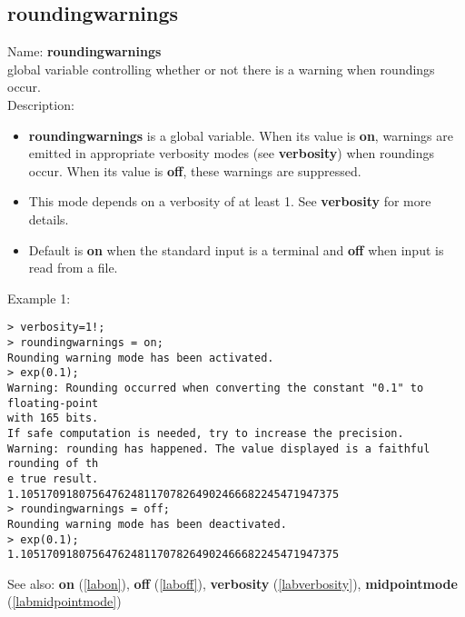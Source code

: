 \subsection{roundingwarnings}
\label{labroundingwarnings}
\noindent Name: \textbf{roundingwarnings}\\
global variable controlling whether or not there is a warning when roundings occur.\\
\noindent Description: \begin{itemize}

\item \textbf{roundingwarnings} is a global variable. When its value is \textbf{on}, warnings are
   emitted in appropriate verbosity modes (see \textbf{verbosity}) when roundings
   occur.  When its value is \textbf{off}, these warnings are suppressed.

\item This mode depends on a verbosity of at least 1. See
   \textbf{verbosity} for more details.

\item Default is \textbf{on} when the standard input is a terminal and
   \textbf{off} when \sollya input is read from a file.
\end{itemize}
\noindent Example 1: 
\begin{center}\begin{minipage}{15cm}\begin{Verbatim}[frame=single]
> verbosity=1!;
> roundingwarnings = on;
Rounding warning mode has been activated.
> exp(0.1);
Warning: Rounding occurred when converting the constant "0.1" to floating-point 
with 165 bits.
If safe computation is needed, try to increase the precision.
Warning: rounding has happened. The value displayed is a faithful rounding of th
e true result.
1.1051709180756476248117078264902466682245471947375
> roundingwarnings = off;
Rounding warning mode has been deactivated.
> exp(0.1);
1.1051709180756476248117078264902466682245471947375
\end{Verbatim}
\end{minipage}\end{center}
See also: \textbf{on} (\ref{labon}), \textbf{off} (\ref{laboff}), \textbf{verbosity} (\ref{labverbosity}), \textbf{midpointmode} (\ref{labmidpointmode})

